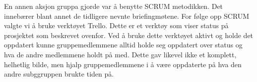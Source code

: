 En annen aksjon gruppa gjorde var å benytte SCRUM metodikken. Det innebærer blant annet de tidligere nevnte briefingmøtene. For følge opp SCRUM valgte vi å bruke verktøyet Trello. Dette er et verktøy som viser status på prosjektet som beskrevet ovenfor. Ved å bruke dette verktøyet aktivt og holde det oppdatert kunne gruppemedlemmene alltid holde seg oppdatert over status og hva de andre medlemmene holdt på med. Dette gav likevel ikke et komplett, helhetlig bilde, men hjalp gruppemedlemmene i å være oppdaterte på hva den andre subggruppen brukte tiden på.\\





